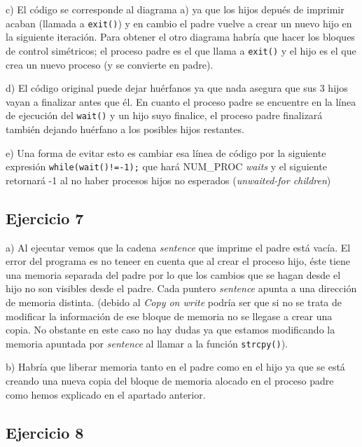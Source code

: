 \documentclass{article}
\begin{document}
c) El código se corresponde al diagrama a) ya que los hijos depués de imprimir acaban (llamada a \texttt{exit()}) y en cambio el padre vuelve a crear un nuevo hijo en la siguiente iteración. Para obtener el otro diagrama habría que hacer los bloques de control simétricos; el proceso padre es el que llama a \texttt{exit()} y el hijo es el que crea un nuevo proceso (y se convierte en padre).

d) El código original puede dejar huérfanos ya que nada asegura que sus 3 hijos vayan a finalizar antes que él. En cuanto el proceso padre se encuentre en la línea de ejecución del \texttt{wait()} y un hijo suyo finalice, el proceso padre finalizará también dejando huérfano a los posibles hijos restantes. 

e) Una forma de evitar esto es cambiar esa línea de código por la siguiente expresión \texttt{while(wait()!=-1);} que hará NUM\_PROC \textit{waits} y el siguiente retornará -1 al no haber procesos hijos no esperados (\textit{unwaited-for children}) 

\subsection*{Ejercicio 7}

a) Al ejecutar vemos que la cadena \textit{sentence} que imprime el padre está vacía. El error del programa es no teneer en cuenta que al crear el proceso hijo, éste tiene una memoria separada del padre  por lo que los cambios que se hagan desde el hijo no son visibles desde el padre. Cada puntero \textit{sentence} apunta a una dirección de memoria distinta.
(debido al \textit{Copy on write} podría ser que si no se trata de modificar la información de ese bloque de memoria no se llegase a crear una copia. No obstante en este caso no hay dudas ya que estamos modificando la memoria apuntada por \textit{sentence} al llamar a la función \texttt{strcpy()}).

b) Habría que liberar memoria tanto en el padre como en el hijo ya que se está creando una nueva copia del bloque de memoria alocado en el proceso padre como hemos explicado en el apartado anterior.


\subsection*{Ejercicio 8}
\end{document}

